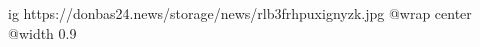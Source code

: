  
 
 
 
 

\ifcmt
  ig https://donbas24.news/storage/news/rlb3frhpuxignyzk.jpg
  @wrap center
  @width 0.9
\fi
